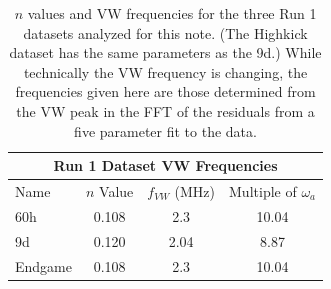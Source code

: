 \documentclass[12pt,letterpaper]{article}
\def\wa{$\omega_{a}$\xspace}
\begin{document}
\begin{table}[]
\centering
\setlength\tabcolsep{10pt}
\renewcommand{\arraystretch}{1.2}
\begin{tabular*}{.8\linewidth}{@{\extracolsep{\fill}}lccc}
  \hline
    \multicolumn{4}{c}{\textbf{Run 1 Dataset VW Frequencies}} \\
  \hline\hline
    Name & $n$ Value & $f_{VW}$ (MHz) & Multiple of \wa \\
  \hline
    60h &  0.108 & 2.3 & 10.04\\
    9d & 0.120 & 2.04 & 8.87 \\
    Endgame & 0.108 & 2.3 & 10.04 \\
  \hline
\end{tabular*}
\caption[Run 1 datasets]{$n$ values and VW frequencies for the three Run 1 datasets analyzed for this note. (The Highkick dataset has the same parameters as the 9d.) While technically the VW frequency is changing, the frequencies given here are those determined from the VW peak in the FFT of the residuals from a five parameter fit to the data.}
\label{tab:Run1Datasets}
\end{table}
\end{document}
